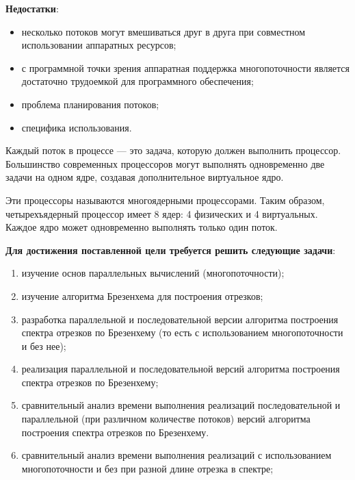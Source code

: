 \textbf{Недостатки}:
\begin{itemize}
	\item несколько потоков могут вмешиваться друг в друга при совместном использовании аппаратных ресурсов;
	\item с программной точки зрения аппаратная поддержка многопоточности является достаточно трудоемкой для программного обеспечения;
	\item проблема планирования потоков;
	\item специфика использования. 
\end{itemize}

Каждый поток в процессе --- это задача, которую должен выполнить процессор. Большинство современных процессоров могут выполнять одновременно две задачи на одном ядре, создавая дополнительное виртуальное ядро. 

Эти процессоры называются многоядерными процессорами. Таким образом, четырехъядерный процессор имеет 8 ядер: 4 физических и 4 виртуальных. Каждое ядро может одновременно выполнять только один поток.


\textbf{Для достижения поставленной цели требуется решить следующие задачи}:
\begin{enumerate}[label={\arabic*)}]
	\item изучение основ параллельных вычислений (многопоточности);
	\item изучение алгоритма Брезенхема для построения отрезков;
	\item разработка параллельной и последовательной версии алгоритма построения спектра отрезков по Брезенхему (то есть с использованием многопоточности и без нее);
	\item реализация параллельной и последовательной версий алгоритма построения спектра отрезков по Брезенхему;
    \item сравнительный анализ времени выполнения реализаций последовательной и параллельной (при различном количестве потоков) версий алгоритма построения спектра отрезков по Брезенхему.
    \item сравнительный анализ времени выполнения реализаций с использованием многопоточности и без при разной длине отрезка в спектре;
\end{enumerate}